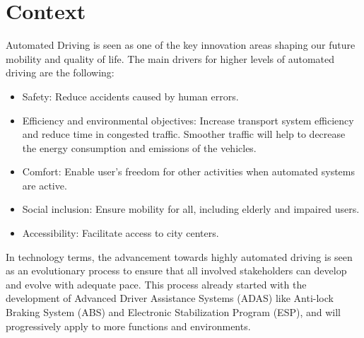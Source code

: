
\section{Context}
Automated Driving is seen as one of the key innovation areas shaping our future mobility and quality of life. The main drivers for higher levels of automated driving are the following:
\begin{itemize}
	\item Safety: Reduce accidents caused by human errors.
	\item Efficiency and environmental objectives: Increase transport system efficiency and reduce time in congested traffic. Smoother traffic will help to decrease the energy consumption and emissions of the vehicles.
	\item Comfort: Enable user's freedom for other activities when automated systems are active.
	\item Social inclusion: Ensure mobility for all, including elderly and impaired users.
	\item Accessibility: Facilitate access to city centers.
\end{itemize}
In technology terms, the advancement towards highly automated driving is seen as an evolutionary process to ensure that all involved stakeholders can develop and evolve with adequate pace. This process already started with the development of Advanced Driver Assistance Systems (ADAS)  like Anti-lock Braking System (ABS) and Electronic Stabilization Program (ESP), and will progressively apply to more functions and environments.

